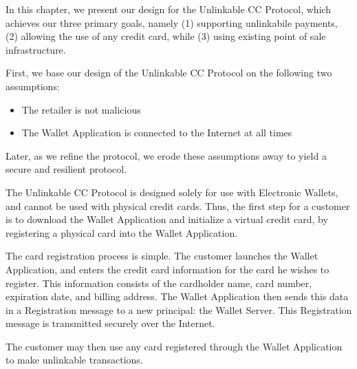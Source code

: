 In this chapter, we present our design for the Unlinkable CC Protocol, which achieves our three primary goals, namely
    (1) supporting unlinkabile payments,
    (2) allowing the use of any credit card,
    while (3) using existing point of sale infrastructure.

First, we base our design of the Unlinkable CC Protocol on the following two assumptions:
\begin{itemize}
\item The retailer is not malicious
\item The Wallet Application is connected to the Internet at all times
\end{itemize}
Later, as we refine the protocol, we erode these assumptions away to yield a secure and resilient protocol.

The Unlinkable CC Protocol is designed solely for use with Electronic Wallets, and cannot be used with physical credit cards.
Thus, the first step for a customer is to download the Wallet Application and initialize a virtual credit card,
     by registering a physical card into the Wallet Application.

The card registration process is simple.
The customer launches the Wallet Application, and enters the credit card information for the card he wishes to register.
This information consists of the cardholder name, card number, expiration date, and billing address.
The Wallet Application then sends this data in a Registration message to a new principal: the Wallet Server.
This Registration message is transmitted securely over the Internet.

The customer may then use any card registered through the Wallet Application to make unlinkable transactions.
